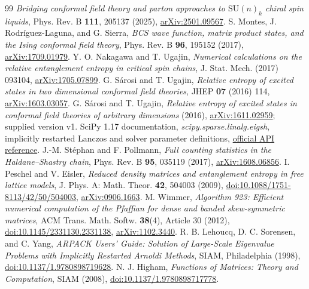 \documentclass[11pt]{article}
\begin{document}
\begin{thebibliography}{99}
\emph{Bridging conformal field theory and parton approaches to
$\mathrm{SU}(n)_k$ chiral spin liquids}, Phys. Rev. B \textbf{111}, 205137 (2025),
\href{https://arxiv.org/abs/2501.09567}{arXiv:2501.09567}.
 S. Montes, J. Rodr\'{i}guez-Laguna, and G. Sierra,
\emph{BCS wave function, matrix product states, and the Ising conformal field theory},
Phys. Rev. B \textbf{96}, 195152 (2017),
\href{https://arxiv.org/abs/1709.01979}{arXiv:1709.01979}.
 Y. O. Nakagawa and T. Ugajin,
\emph{Numerical calculations on the relative entanglement entropy in critical spin chains},
J. Stat. Mech. (2017) 093104,
\href{https://arxiv.org/abs/1705.07899}{arXiv:1705.07899}.
 G. S\'{a}rosi and T. Ugajin,
\emph{Relative entropy of excited states in two dimensional conformal field theories},
JHEP \textbf{07} (2016) 114,
\href{https://arxiv.org/abs/1603.03057}{arXiv:1603.03057}.
 G. S\'{a}rosi and T. Ugajin,
\emph{Relative entropy of excited states in conformal field theories of
arbitrary dimensions} (2016),
\href{https://arxiv.org/abs/1611.02959}{arXiv:1611.02959}; supplied version v1.
 SciPy 1.17 documentation,
\emph{scipy.sparse.linalg.eigsh}, implicitly restarted Lanczos
and solver parameter definitions,
\href{https://docs.scipy.org/doc/scipy-1.17.0/reference/generated/scipy.sparse.linalg.eigsh.html}{official API reference}.
 J.-M. St\'{e}phan and F. Pollmann,
\emph{Full counting statistics in the Haldane--Shastry chain},
Phys. Rev. B \textbf{95}, 035119 (2017),
\href{https://arxiv.org/abs/1608.06856}{arXiv:1608.06856}.
 I. Peschel and V. Eisler,
\emph{Reduced density matrices and entanglement entropy in free lattice models},
J. Phys. A: Math. Theor. \textbf{42}, 504003 (2009),
\href{https://doi.org/10.1088/1751-8113/42/50/504003}{doi:10.1088/1751-8113/42/50/504003},
\href{https://arxiv.org/abs/0906.1663}{arXiv:0906.1663}.
 M. Wimmer,
\emph{Algorithm 923: Efficient numerical computation of the Pfaffian
for dense and banded skew-symmetric matrices},
ACM Trans. Math. Softw. \textbf{38}(4), Article 30 (2012),
\href{https://doi.org/10.1145/2331130.2331138}{doi:10.1145/2331130.2331138},
\href{https://arxiv.org/abs/1102.3440}{arXiv:1102.3440}.
 R. B. Lehoucq, D. C. Sorensen, and C. Yang,
\emph{ARPACK Users' Guide: Solution of Large-Scale Eigenvalue Problems
with Implicitly Restarted Arnoldi Methods}, SIAM, Philadelphia (1998),
\href{https://doi.org/10.1137/1.9780898719628}{doi:10.1137/1.9780898719628}.
 N. J. Higham, \emph{Functions of Matrices: Theory and Computation}, SIAM (2008),
\href{https://doi.org/10.1137/1.9780898717778}{doi:10.1137/1.9780898717778}.
\end{thebibliography}
\end{document}
